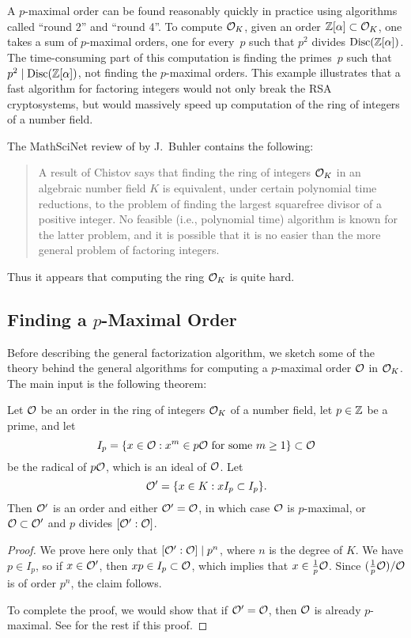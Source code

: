 A $p$-maximal order can be found reasonably quickly in practice using
algorithms called ``round 2'' and ``round 4''.  To
compute $\mathcal{O}_K$, given an order $\mathbb{Z}[\alpha]\subset \mathcal{O}_K$, one takes a
sum of $p$-maximal orders, one for every~$p$ such that $p^2$ divides
$\operatorname{Disc}(\mathbb{Z}[\alpha])$.  The time-consuming part of this computation is
finding the primes~$p$ such that $p^2\mid \operatorname{Disc}(\mathbb{Z}[\alpha])$, not
finding the $p$-maximal orders.  This example illustrates that
a fast algorithm for factoring integers would not only break the RSA
cryptosystems, but would massively speed up computation of the ring of
integers of a number field.
\begin{remark}
The MathSciNet review of \cite{buchmann_lenstra:approx} by
J.~Buhler contains the following:
\begin{quote}
    A result of Chistov says that finding the ring of integers $\mathcal{O}_K$
    in an algebraic number field $K$ is equivalent, under certain
    polynomial time reductions, to the problem of finding the largest
    squarefree divisor of a positive integer. No feasible (i.e.,
    polynomial time) algorithm is known for the latter problem, and it
    is possible that it is no easier than the more general problem of
    factoring integers.
\end{quote}
Thus it appears that computing the ring $\mathcal{O}_K$ is quite hard.
\end{remark}

\subsection{Finding a $p$-Maximal Order}\label{sec:alg_pmax}
Before describing the general factorization algorithm, we sketch some
of the theory behind the general algorithms for computing a
$p$-maximal order $\mathcal{O}$ in $\mathcal{O}_K$.  The main input is the following
theorem:
\begin{theorem}
Let $\mathcal{O}$ be an order in the ring of integers $\mathcal{O}_K$ of a number field, let $p\in\mathbb{Z}$ be a prime,
and let
$$I_p = \{x \in \mathcal{O} : x^m \in p\mathcal{O} \text{ for some $m\geq 1$}\} \subset \mathcal{O}$$
be the radical of $p\mathcal{O}$, which is an ideal of $\mathcal{O}$.
Let
$$
  \mathcal{O}' = \{x \in K : xI_p \subset I_p\}.
$$
Then $\mathcal{O}'$ is an order and either $\mathcal{O}'=\mathcal{O}$, in which case $\mathcal{O}$ is
$p$-maximal, or $\mathcal{O}\subset\mathcal{O}'$ and $p$ divides $[\mathcal{O}':\mathcal{O}]$.
\end{theorem}
\begin{proof}
  We prove here only that $[\mathcal{O}':\mathcal{O}] \mid p^n$, where $n$ is the degree
  of $K$.  We have $p\in I_p$, so if $x \in \mathcal{O}'$, then $xp \in
  I_p\subset \mathcal{O}$, which implies that $x\in \frac{1}{p}\mathcal{O}$.  Since
  $(\frac{1}{p}\mathcal{O})/\mathcal{O}$ is of order $p^n$, the claim follows.

To complete the proof, we would show that if $\mathcal{O}' = \mathcal{O}$, then $\mathcal{O}$ is
already $p$-maximal.  See \cite[\S6.1.1]{cohen:course_ant} for the
rest if this proof.
\end{proof}

